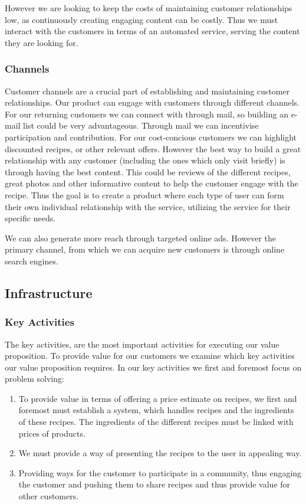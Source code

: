 \documentclass{article}
\begin{document}
However we are looking to keep the costs of maintaining customer relationships low, as
continuously creating engaging content can be costly. Thus we must interact with the
customers in terms of an automated service, serving the content they are looking for.

\subsubsection{Channels}
Customer channels are a crucial part of establishing and maintaining customer
relationships.  Our product can engage with customers through different channels. For our
returning customers we can connect with through mail, so building an e-mail list could be
very advantageous. Through mail we can incentivise participation and contribution. For our
cost-concious customers we can highlight discounted recipes, or other relevant offers.
However the best way to build a great relationship with any customer (including the ones
which only visit briefly)  is through having the best content. This could be reviews of
the different recipes, great photos and other informative content to help the customer
engage with the recipe.  Thus the goal is to create a product where each type of user can
form their own individual relationship with the service, utilizing the service for their
specific needs.

We can also generate more reach through targeted online ads. However the primary channel,
from which we can acquire new customers is through online search engines.

\subsection{Infrastructure}
\subsubsection{Key Activities}
The key activities, are the most important activities for executing our value proposition.
To provide value for our customers we examine which key activities our value proposition
requires. In our key activities we first and foremost focus on problem solving:

\begin{enumerate}
  \item To provide value in terms of offering a price estimate on recipes, we first and
    foremost must establish a system, which handles recipes and the ingredients of these
    recipes. The ingredients of the different recipes must be linked with prices of
    products.
  \item We must provide a way of presenting the recipes to the user in appealing way.
  \item Providing ways for the customer to participate in a community, thus engaging the
    customer and pushing them to share recipes and thus provide value for other customers. 
\end{enumerate}
\end{document}
